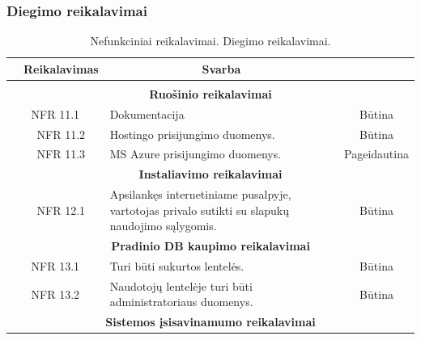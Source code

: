 \documentclass{VUMIFPSkursinis}
\begin{document}
\subsubsection{Diegimo reikalavimai}
\begin{table}[H]
	\caption{Nefunkciniai reikalavimai. Diegimo reikalavimai.}
	\begin{tabular}{|p{1cm}|p{1cm}|p{}|p{}|}
		\hline 
		\rowcolor{gray!50}
		\multicolumn{2}{|c|}{{\bfseries Kodas}}&
		\multicolumn{1}{c|}{{\bfseries Reikalavimas}}&
		\multicolumn{1}{c|}{{\bfseries Svarba}}\\
		\hline
		\rowcolor{lightgray}
		\multicolumn{4}{|c|}{Diegimo reikalavimai}\\		
		
		\hline
		\multicolumn{4}{|c|}{\bfseries Ruošinio reikalavimai}\\	
		
		\hline
		\multicolumn{2}{|c|}{NFR 11.1}&
		{Dokumentacija
		}&		
		\multicolumn{1}{c|}{Būtina}\\
		\hline
		\multicolumn{1}{|c}{}&
		\multicolumn{1}{c|}{NFR 11.2}&
		{Hostingo prisijungimo duomenys.
		}&		
		\multicolumn{1}{c|}{Būtina}\\
		
		\hline
		\multicolumn{1}{|c}{}&
		\multicolumn{1}{c|}{NFR 11.3}&
		{MS Azure prisijungimo duomenys.
		}&		
		\multicolumn{1}{c|}{Pageidautina}\\
		
		
		\hline
		\multicolumn{4}{|c|}{\bfseries Instaliavimo reikalavimai}\\		
		
		\hline
		\multicolumn{1}{|c}{}&
		\multicolumn{1}{c|}{NFR 12.1}&
		{Apsilankęs internetiniame pusalpyje, vartotojas privalo sutikti su slapukų naudojimo sąlygomis.
		}&
		\multicolumn{1}{c|}{Būtina}\\	
		
		\hline
		\multicolumn{4}{|c|}{\bfseries Pradinio DB kaupimo reikalavimai}\\		
		
		\hline
		\multicolumn{2}{|c|}{NFR 13.1}&
		{Turi būti sukurtos lentelės.}&
		\multicolumn{1}{c|}{Būtina}\\
		
		\hline
		\multicolumn{2}{|c|}{NFR 13.2}&
		{Naudotojų lentelėje turi būti administratoriaus duomenys.}&
		\multicolumn{1}{c|}{Būtina}\\	
		
		\hline
		\multicolumn{4}{|c|}{\bfseries Sistemos įsisavinamumo reikalavimai}\\		
		

\end{tabular}
\end{table}
\end{document}
